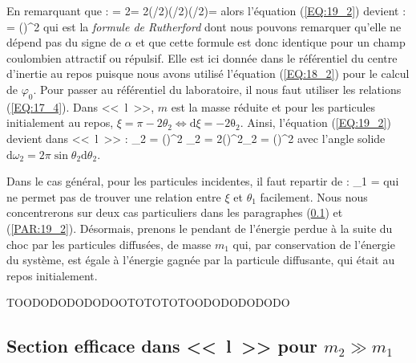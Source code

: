 \eea
En remarquant que :
\be
	\omega = 2\pi\sin\xi{}\xi = 2\pi{}\cos(\xi/2)\sin(\xi/2)\xi \Leftrightarrow \pi\cos(\xi/2)\xi = 
\ee
alors l'\'equation (\ref{EQ:19_2}) devient :
\be
	\sigma = \left(\right)^{2} \label{EQ:19_3}
\ee
qui est la \emph{formule de Rutherford} dont nous pouvons remarquer qu'elle ne d\'epend pas du signe de $\alpha$ et que cette formule est donc identique pour un champ coulombien attractif ou r\'epulsif. Elle est ici donn\'ee dans le r\'ef\'erentiel du centre d'inertie au repos puisque nous avons utilis\'e l'\'equation (\ref{EQ:18_2}) pour le calcul de $\varphi_{0}$. Pour passer au r\'ef\'erentiel du laboratoire, il nous faut utiliser les relations (\ref{EQ:17_4}). Dans <<~l~>>, $m$ est la masse r\'eduite et pour les particules initialement au repos, $\xi = \pi - 2\theta_{2} \Leftrightarrow \mathrm{d}\xi = -2\mathrm{\theta_{2}}$. Ainsi, l'\'equation (\ref{EQ:19_2}) devient dans <<~l~>> :
\be
	\sigma_{2} = \pi\left(\right)^{2} \rvert {}\theta_{2} = 2\pi\left(\right)^{2}\theta_{2} = \left(\right)^{2} \label{EQ:19_4}
\ee
avec l'angle solide $\mathrm{d}\omega_{2} = 2\pi\sin\theta_{2}\mathrm{d}\theta_{2}$.

Dans le cas g\'en\'eral, pour les particules incidentes, il faut repartir de :
\be
	\tan\theta_{1} = 
\ee
qui ne permet pas de trouver une relation entre $\xi$ et $\theta_{1}$ facilement. Nous nous concentrerons sur deux cas particuliers dans les paragraphes (\ref{PAR:19_1}) et (\ref{PAR:19_2}). D\'esormais, prenons le pendant de l'\'energie perdue \`a la suite du choc par les particules diffus\'ees, de masse $m_{1}$ qui, par conservation de l'\'energie du syst\`eme, est \'egale \`a l'\'energie gagn\'ee par la particule diffusante, qui \'etait au repos initialement.

TOODODODODODOOTOTOTOTOODODODODODO

\subsection{Section efficace dans <<~l~>> pour $m_{2} \gg m_{1}$}\label{PAR:19_1}

